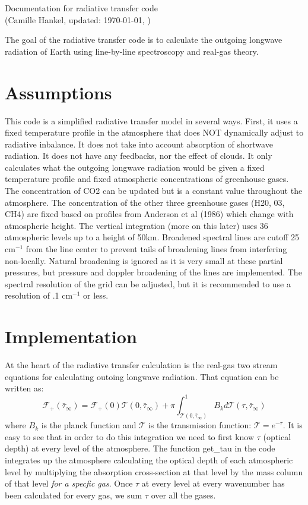 \documentclass[pdftex,twoside,authoryear,round,12pt]{article}
\begin{document}

\begin{center}
  {\Large Documentation for radiative transfer code}\\
  (Camille Hankel, updated: \today, \currenttime)
\end{center}

The goal of the radiative transfer code is to calculate the outgoing longwave radiation of Earth using line-by-line spectroscopy and real-gas theory. 

\section{Assumptions}

This code is a simplified radiative transfer model in several ways. First, it uses a fixed temperature profile in the atmosphere that does NOT dynamically adjust to radiative inbalance. It does not take into account absorption of shortwave radiation. It does not have any feedbacks, nor the effect of clouds. It only calculates what the outgoing longwave radiation would be given a fixed temperature profile and fixed atmospheric concentrations of greenhouse gases. The concentration of CO2 can be updated but is a constant value throughout the atmosphere. The concentration of the other three greenhouse gases (H20, 03, CH4) are fixed based on profiles from Anderson et al (1986) which change with atmospheric height. The vertical integration (more on this later) uses 36 atmospheric levels up to a height of 50km. Broadened spectral lines are cutoff 25 cm$^{-1}$ from the line center to prevent tails of broadening lines from interfering non-locally. Natural broadening is ignored as it is very small at these partial pressures, but pressure and doppler broadening of the lines are implemented. The spectral resolution of the grid can be adjusted, but it is recommended to use a resolution of .1 cm$^{-1}$ or less. 

\section{Implementation}

At the heart of the radiative transfer calculation is the real-gas two stream equations for calculating outoing longwave radiation. That equation can be written as:  
\[\mathcal{F}_+(\bar{\tau}_{\infty}) = \mathcal{F}_+(0)\mathcal{T}(0,\bar{\tau}_{\infty}) + \pi \int_{\mathcal{T}(0,\bar{\tau}_{\infty})}^1 B_{k}d\mathcal{T}(\tau,\bar{\tau}_{\infty})\]
where $B_k$ is the planck function and $\mathcal{T}$ is the transmission function: $\mathcal{T} = e^{-\tau}$. It is easy to see that in order to do this integration we need to first know $\tau$ (optical depth) at every level of the atmosphere. The function get\_tau in the code integrates up the atmosphere calculating the optical depth of each atmospheric level by multiplying the absorption cross-section at that level by the mass column of that level \textit{for a specfic gas}. Once $\tau$ at every level at every wavenumber has been calculated for every gas, we sum $\tau$ over all the gases. 
\end{document}

